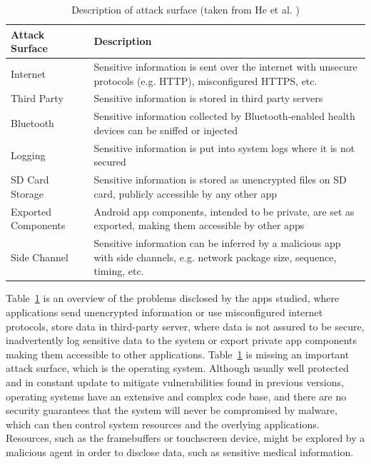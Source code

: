 \begin{table}[t]
	\caption {Description of attack surface (taken from He et al. \cite{he2014security})}
	\label{tab:attacksurfaces}
	\begin{tabular}{|>{\raggedright}p{2cm}|>{\raggedright\arraybackslash}p{10cm}|}
		\hline
		\textbf{Attack Surface}      & \textbf{Description}                                                                                                                    \\ \hline
		Internet            & Sensitive information is sent over the internet with unsecure protocols (e.g. HTTP), misconfigured HTTPS, etc.                 \\ \hline
		Third Party         & Sensitive information is stored in third party servers                                                                         \\ \hline
		Bluetooth           & Sensitive information collected by Bluetooth-enabled health devices can be sniffed or injected                                 \\ \hline
		Logging             & Sensitive information is put into system logs where it is not secured                                                          \\ \hline
		SD Card Storage     & Sensitive information is stored as unencrypted files on SD card, publicly accessible by any other app                          \\ \hline
		Exported Components &  Android app components, intended to be private, are set as exported, making them accessible by other apps                     \\ \hline
		Side Channel        & Sensitive information can be inferred by a malicious app with side channels, e.g. network package size, sequence, timing, etc. \\ \hline
	\end{tabular}
\end{table}

Table~\ref{tab:attacksurfaces} is an overview of the problems disclosed by the apps studied, where applications send unencrypted information or use misconfigured internet protocols, store data in third-party server, where data is not assured to be secure, inadvertently log sensitive data to the system or export private app components making them accessible to other applications. Table~\ref{tab:attacksurfaces} is missing an important attack surface, which is the operating system. Although usually well protected and in constant update to mitigate vulnerabilities found in previous versions, operating systems have an extensive and complex code base, and there are no security guarantees that the system will never be compromised by malware, which can then control system resources and the overlying applications. Resources, such as the framebuffers or touchscreen device, might be explored by a malicious agent in order to disclose data, such as sensitive medical information.

